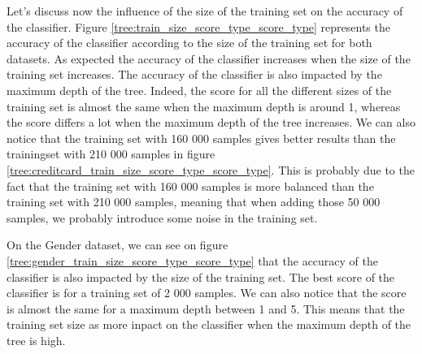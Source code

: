 \documentclass[10pt]{article}
\begin{document}
			Let's discuss now the influence of the size of the training set on the accuracy of the classifier. Figure \ref{tree:train_size_score_type_score_type} represents the accuracy of the classifier according to the size of the training set for both datasets. As expected the accuracy of the classifier increases when the size of the training set increases. The accuracy of the classifier is also impacted by the maximum depth of the tree. Indeed, the score for all the different sizes of the training set is almost the same when the maximum depth is around 1, whereas the score differs a lot when the maximum depth of the tree increases. We can also notice that the training set with 160 000 samples gives better results than the trainingset with 210 000 samples in figure \ref{tree:creditcard_train_size_score_type_score_type}. This is probably due to the fact that the training set with 160 000 samples is more balanced than the training set with 210 000 samples, meaning that when adding those 50 000 samples, we probably introduce some noise in the training set.

			On the Gender dataset, we can see on figure \ref{tree:gender_train_size_score_type_score_type} that the accuracy of the classifier is also impacted by the size of the training set. The best score of the classifier is for a training set of 2 000 samples. We can also notice that the score is almost the same for a maximum depth between 1 and 5. This means that the training set size as more inpact on the classifier when the maximum depth of the tree is high.
\end{document}
